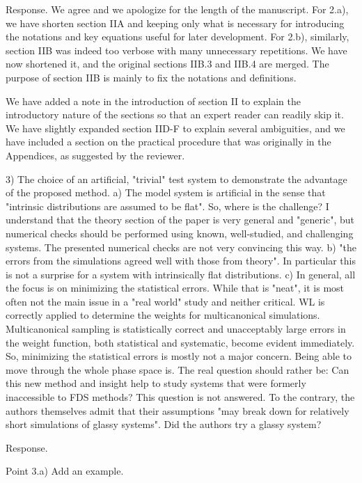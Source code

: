 \documentclass[preprint, superscriptaddress, floatfix]{revtex4-1}
\begin{document}
Response.  We agree and we apologize for the length of the manuscript.
For 2.a), we have shorten section IIA and keeping only what is necessary for introducing the notations and key equations useful for later development.
For 2.b), similarly, section IIB was indeed too verbose with many unnecessary repetitions. We have now shortened it, and the original sections IIB.3 and IIB.4 are merged.
The purpose of section IIB is mainly to fix the notations and definitions.

We have added a note in the introduction of section II to explain the introductory nature of the sections so that an expert reader can readily skip it.
We have slightly expanded section IID-F to explain several ambiguities, and we have included a section on the practical procedure that was originally in the Appendices, as suggested by the reviewer.



3) The choice of an artificial, "trivial" test system to demonstrate the advantage of the proposed method.
a) The model system is artificial in the sense that "intrinsic distributions are assumed to be flat". So, where is the challenge? I understand that the theory section of the paper is very general and "generic", but numerical checks should be performed using known, well-studied, and challenging systems. The presented numerical checks are not very convincing this way.
b) "the errors from the simulations agreed well with those from theory". In particular this is not a surprise for a system with intrinsically flat distributions.
c) In general, all the focus is on minimizing the statistical errors. While that is "neat", it is most often not the main issue in a "real world" study and neither critical. WL is correctly applied to determine the weights for multicanonical simulations. Multicanonical sampling is statistically correct and unacceptably large errors in the weight function, both statistical and systematic, become evident immediately. So, minimizing the statistical errors is mostly not a major concern. Being able to move through the whole phase space is. The real question should rather be: Can this new method and insight help to study systems that were formerly inaccessible to FDS methods? This question is not answered. To the contrary, the authors themselves admit that their assumptions "may break down for relatively short simulations of glassy systems". Did the authors try a glassy system?

Response.

Point 3.a) Add an example.
\end{document}
